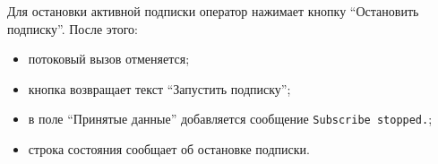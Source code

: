 Для остановки активной подписки оператор нажимает кнопку
``Остановить подписку''. После этого:

\begin{itemize}
	\item потоковый вызов отменяется;
	\item кнопка возвращает текст ``Запустить подписку'';
	\item в поле ``Принятые данные'' добавляется сообщение \texttt{Subscribe stopped.};
	\item строка состояния сообщает об остановке подписки.
\end{itemize}